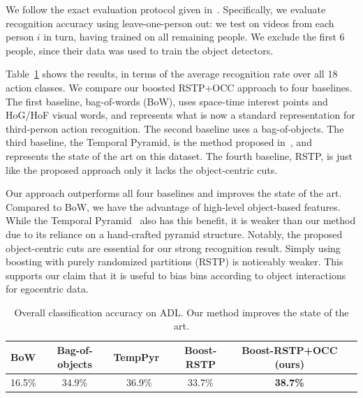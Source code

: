 %
%


  We follow the exact evaluation protocol given in~\cite{Ramanan12}.  Specifically, we evaluate recognition accuracy using leave-one-person out: we test on videos from each person $i$ in turn, having trained on all remaining people.  We exclude the first 6 people, since their data was used to train the object detectors.
  
  
Table~\ref{table:results} shows the results, in terms of the average recognition rate over all 18 action classes.  We compare our boosted RSTP+OCC approach to four baselines.  The first baseline, bag-of-words (BoW), uses space-time interest points and HoG/HoF visual words, and represents what is now a standard representation for third-person action recognition.  The second baseline uses a bag-of-objects.  The third baseline, the Temporal Pyramid, is the method proposed in~\cite{Ramanan12}, and represents the state of the art on this dataset.  The fourth baseline, RSTP, is just like the proposed approach only it lacks the object-centric cuts.

Our approach outperforms all four baselines and improves the state of the art.  Compared to BoW, we have the advantage of high-level object-based features.  While the Temporal Pyramid~\cite{Ramanan12} also has this benefit, it is weaker than our method due to its reliance on a hand-crafted pyramid structure.  Notably, the proposed object-centric cuts are essential for our strong recognition result.  Simply using  boosting with purely randomized partitions (RSTP) is noticeably weaker.  This supports our claim that it is useful to bias bins according to object interactions for egocentric data.


  \begin{table}
		\begin{center}
			\begin{tabular}{|l|c|c|c|c|c|}
				\hline
        BoW & Bag-of-objects & TempPyr~\cite{Ramanan12} & Boost-RSTP & Boost-RSTP+OCC (ours) \\
				\hline\hline
        16.5\% & 34.9\% & 36.9\% & 33.7\% & \textbf{38.7\%}\\
				\hline
			\end{tabular}
		\end{center}
		\caption{Overall classification accuracy on ADL. Our method improves the state of the art.}\label{table:results}
	\end{table}

